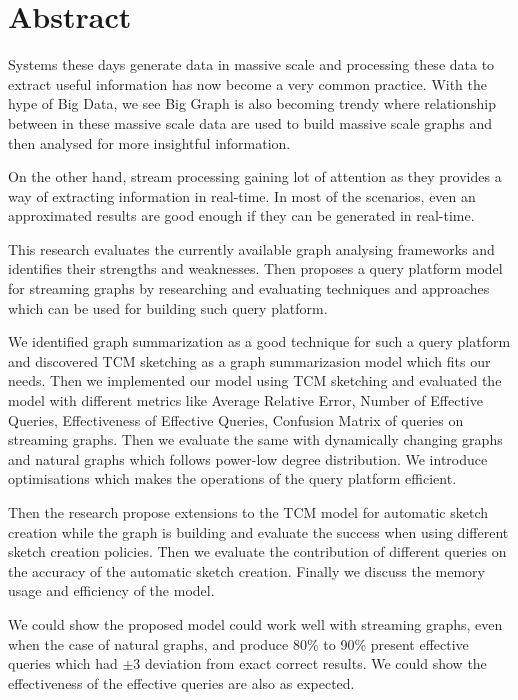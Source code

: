 \documentclass[12pt]{report}
\numberwithin{figure}{section}
\numberwithin{table}{section}
\begin{document}
\section*{Abstract}
%

Systems these days generate data in massive scale and processing these data to extract useful information has now become a very common practice. With the hype of Big Data, we see Big Graph is also becoming trendy where relationship between in these massive scale data are used to build massive scale graphs and then analysed for more insightful information.

On the other hand, stream processing gaining lot of attention as they provides a way of extracting information in real-time. In most of the scenarios, even an approximated results are good enough if they can be generated in real-time.

This research evaluates the currently available graph analysing frameworks and identifies their strengths and weaknesses. Then proposes a query platform model for streaming graphs by researching and evaluating techniques and approaches which can be used for building such query platform. 

We identified graph summarization as a good technique for such a query platform and discovered TCM sketching as a graph summarizasion model which fits our needs. Then we implemented our model using TCM sketching and evaluated the model with different metrics like Average Relative Error, Number of Effective Queries, Effectiveness of Effective Queries, Confusion Matrix of queries on streaming graphs. Then we evaluate the same with dynamically changing graphs and natural graphs which follows power-low degree distribution. We introduce optimisations which makes the operations of the query platform efficient.

Then the research propose extensions to the TCM model for automatic sketch creation while the graph is building and evaluate the success when using different sketch creation policies. Then we evaluate the contribution of different queries on the accuracy of the automatic sketch creation. Finally we discuss the memory usage and efficiency of the model. 

We could show the proposed model could work well with streaming graphs, even when the case of natural graphs, and produce 80\% to 90\% present effective queries which had $ \pm3$ deviation from exact correct results. We could show the effectiveness of the effective queries are also as expected.\\
  
\end{document}
